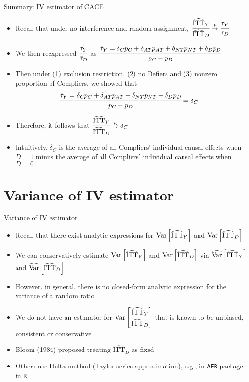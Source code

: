\documentclass[table, xcolor={dvipsnames}, 9pt]{beamer}
\theoremstyle{newstyle}
\DeclareMathOperator{\Var}{\rm{Var}}
\begin{document}
\begin{frame}{Summary: IV estimator of CACE}
\begin{itemize}
\item Recall that under no-interference and random assignment, $\cfrac{\widehat{\text{ITT}}_Y}{\widehat{\text{ITT}}_D} \overset{p}{\to} \cfrac{\bar{\tau}_Y}{\bar{\tau}_D}$
\item We then reexpressed $\cfrac{\bar{\tau}_Y}{\bar{\tau}_D}$ as $\cfrac{\bar{\tau}_Y = \delta_C p_C + \delta_{AT} p_{AT} + \delta_{NT} p_{NT} + \delta_D p_D}{p_C - p_D}$
\item Then under (1) exclusion restriction, (2) no Defiers and (3) nonzero proportion of Compliers, we showed that 
\begin{align*}
\cfrac{\bar{\tau}_Y = \delta_C p_C + \delta_{AT} p_{AT} + \delta_{NT} p_{NT} + \delta_D p_D}{p_C - p_D} & = \delta_C
\end{align*}
\item Therefore, it follows that $\cfrac{\widehat{\text{ITT}}_Y}{\widehat{\text{ITT}}_D} \overset{p}{\to} \delta_C$
\item Intuitively, $\delta_C$ is the average of all Compliers' individual causal effects when $D = 1$ minus the average of all Compliers' individual causal effects when $D = 0$
\end{itemize}
\end{frame}
\section{Variance of IV estimator}
\begin{frame}{Variance of IV estimator}
\begin{itemize}
\item Recall that there exist analytic expressions for $\Var\left[\widehat{\text{ITT}}_Y\right]$ and $\Var\left[\widehat{\text{ITT}}_D\right]$
\item \pause We can conservatively estimate $\Var\left[\widehat{\text{ITT}}_Y\right]$ and $\Var\left[\widehat{\text{ITT}}_D\right]$ via $\widehat{\Var}\left[\widehat{\text{ITT}}_Y\right]$ and $\widehat{\Var}\left[\widehat{\text{ITT}}_D\right]$
\item \pause However, in general, there is no closed-form analytic expression for the variance of a random ratio
\item \pause We do not have an estimator for $\Var\left[\cfrac{\widehat{\text{ITT}}_Y}{\widehat{\text{ITT}}_D}\right]$ that is known to be unbiased, consistent or conservative
\item \pause Bloom (1984) proposed treating $\widehat{\text{ITT}}_D$ as fixed
\item \pause Others use Delta method (Taylor series approximation), e.g., in \texttt{AER} package in \texttt{R}
\end{itemize}	
\end{frame}
\end{document}
